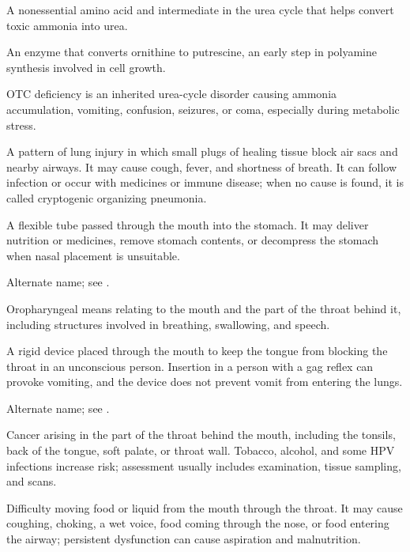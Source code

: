  A nonessential amino acid and intermediate in the urea cycle that helps convert toxic ammonia into urea.

 An enzyme that converts ornithine to putrescine, an early step in polyamine synthesis involved in cell growth.

 OTC deficiency is an inherited urea-cycle disorder causing ammonia accumulation, vomiting, confusion, seizures, or coma, especially during metabolic stress.

 A pattern of lung injury in which small plugs of
healing tissue block air sacs and nearby airways. It may cause cough, fever, and
shortness of breath. It can follow infection or occur with medicines or immune
disease; when no cause is found, it is called cryptogenic organizing pneumonia.

 A flexible tube passed through the mouth into the stomach. It may deliver nutrition or medicines, remove stomach contents, or decompress the stomach when nasal placement is unsuitable.

 Alternate name; see .

 Oropharyngeal means relating to the mouth and the part of the throat behind it, including structures involved in breathing, swallowing, and speech.

 A rigid device placed through the mouth to keep the tongue from blocking the throat in an unconscious person. Insertion in a person with a gag reflex can provoke vomiting, and the device does not prevent vomit from entering the lungs.

 Alternate name; see .

 Cancer arising in the part of the throat behind the mouth, including the tonsils, back of the tongue, soft palate, or throat wall. Tobacco, alcohol, and some HPV infections increase risk; assessment usually includes examination, tissue sampling, and scans.

 Difficulty moving food or liquid from the mouth through the throat. It may cause coughing, choking, a wet voice, food coming through the nose, or food entering the airway; persistent dysfunction can cause aspiration and malnutrition.


